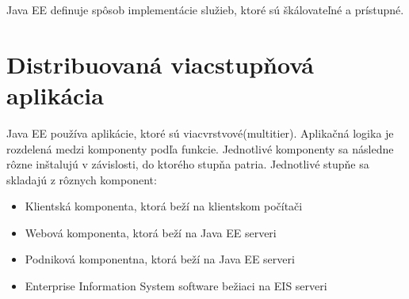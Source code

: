 \indent Java EE definuje spôsob implementácie služieb, ktoré sú škálovateľné a prístupné.

\section{Distribuovaná viacstupňová aplikácia}
Java EE používa aplikácie, ktoré sú viacvrstvové(multitier). Aplikačná logika je rozdelená medzi komponenty podľa funkcie.\cite{Pravidla} Jednotlivé komponenty sa následne rôzne inštalujú v závislosti, do ktorého stupňa patria. Jednotlivé stupňe sa skladajú z rôznych komponent:
\begin{itemize}
\item Klientská komponenta, ktorá beží na klientskom počítači
\item Webová komponenta, ktorá beží na Java EE serveri
\item Podniková komponentna, ktorá beží na Java EE serveri
\item Enterprise Information System software bežiaci na EIS serveri
\end{itemize}

